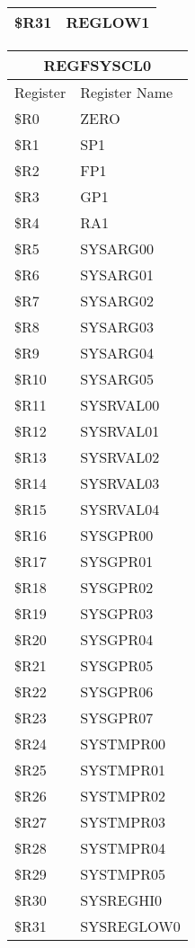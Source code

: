 \documentclass[letterpaper, 11pt]{article}
\begin{document}
\begin{figure}[!h]
{\begin{tabular}{|l|l|}
				\$R31 & REGLOW1  \\ \hline
			\end{tabular}
		}
		\hfill
		\parbox{0.2\linewidth}{
			\centering
			\fontsize{6}{8}\selectfont
			\begin{tabular}{|l|l|}
				\hline
				\multicolumn{2}{|c|}{REGFSYSCL0} \\
				\hline
				Register & Register Name \\ \hline
				\$R0  & ZERO \\ 	\hline
				\$R1  & SP1 \\ 	\hline
				\$R2  & FP1 \\ 	\hline
				\$R3  & GP1 \\ 	\hline
				\$R4  & RA1 \\ 	\hline
				\$R5  & SYSARG00 \\ 	\hline
				\$R6  & SYSARG01 \\ 	\hline
				\$R7  & SYSARG02 \\ 	\hline
				\$R8  & SYSARG03 \\ 	\hline
				\$R9  & SYSARG04 \\ 	\hline
				\$R10 & SYSARG05 \\ \hline
				\$R11 & SYSRVAL00  \\ \hline
				\$R12 & SYSRVAL01  \\ \hline
				\$R13 & SYSRVAL02  \\ \hline
				\$R14 & SYSRVAL03  \\ \hline
				\$R15 & SYSRVAL04  \\ \hline
				\$R16 & SYSGPR00  \\ \hline
				\$R17 & SYSGPR01  \\ \hline
				\$R18 & SYSGPR02  \\ \hline
				\$R19 & SYSGPR03  \\ \hline
				\$R20 & SYSGPR04  \\ \hline
				\$R21 & SYSGPR05  \\ \hline
				\$R22 & SYSGPR06  \\ \hline
				\$R23 & SYSGPR07  \\ \hline
				\$R24 & SYSTMPR00  \\ \hline
				\$R25 & SYSTMPR01  \\ \hline
				\$R26 & SYSTMPR02  \\ \hline
				\$R27 & SYSTMPR03  \\ \hline
				\$R28 & SYSTMPR04  \\ \hline
				\$R29 & SYSTMPR05  \\ \hline
				\$R30 & SYSREGHI0  \\ \hline
				\$R31 & SYSREGLOW0  \\ \hline
			\end{tabular}
		}
	\end{figure}
\end{document}
